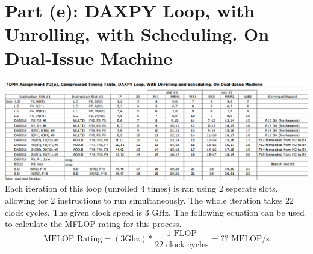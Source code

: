 \documentclass[12pt, letterpaper, titlepage, hidelinks]{article}
\begin{document}
\section{Part (e): DAXPY Loop, with Unrolling, with Scheduling. On  Dual-Issue Machine}
	\includegraphics[width=\textwidth]{2e}
	Each iteration of this loop (unrolled 4 times) is ran using 2 seperate slots, allowing for 2 instructions to run simultaneously. The whole iteration takes 22 clock cycles. The given clock speed is 3 GHz. The following equation can be used to calculate the MFLOP rating for this process.
	\begin{equation}
		\text{MFLOP Rating} = (3 \text{{Ghz}}) * \frac{1 \text{ FLOP}}{22 \text{ clock cycles}} = ?? \text{ MFLOP/s}
	\end{equation}
\end{document}

